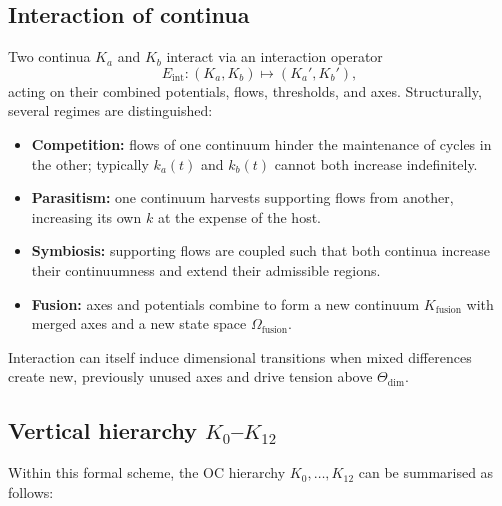 \subsection{Interaction of continua}

Two continua \(K_a\) and \(K_b\) interact via an interaction operator
\[
    E_{\mathrm{int}} : (K_a,K_b) \mapsto (K_a',K_b'),
\]
acting on their combined potentials, flows, thresholds, and axes.
Structurally, several regimes are distinguished:

\begin{itemize}
    \item \textbf{Competition:} flows of one continuum hinder the maintenance of cycles in the other; typically \(k_a(t)\) and \(k_b(t)\) cannot both increase indefinitely.
    \item \textbf{Parasitism:} one continuum harvests supporting flows from another, increasing its own \(k\) at the expense of the host.
    \item \textbf{Symbiosis:} supporting flows are coupled such that both continua increase their continuumness and extend their admissible regions.
    \item \textbf{Fusion:} axes and potentials combine to form a new continuum \(K_{\mathrm{fusion}}\) with merged axes and a new state space \(\Omega_{\mathrm{fusion}}\).
\end{itemize}

Interaction can itself induce dimensional transitions when mixed differences
create new, previously unused axes and drive tension above
\(\Theta_{\mathrm{dim}}\).

\subsection{Vertical hierarchy \texorpdfstring{$K_0$--$K_{12}$}{K0--K12}}

Within this formal scheme, the OC hierarchy \(K_0,\dots,K_{12}\) can be summarised as follows:

